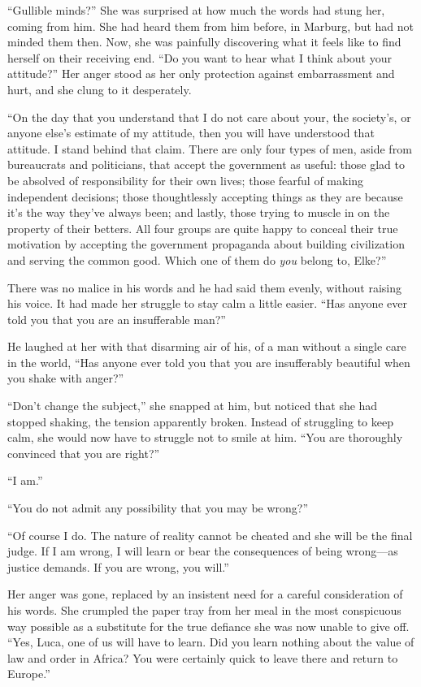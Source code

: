 ``Gullible minds?'' She was surprised at how much the words had stung her, coming from him. She had heard them from him before, in Marburg, but had not minded them then. Now, she was painfully discovering what it feels like to find herself on their receiving end. ``Do you want to hear what I think about your attitude?'' Her anger stood as her only protection against embarrassment and hurt, and she clung to it desperately.

``On the day that you understand that I do not care about your, the society's, or anyone else's estimate of my attitude, then you will have understood that attitude. I stand behind that claim. There are only four types of men, aside from bureaucrats and politicians, that accept the government as useful: those glad to be absolved of responsibility for their own lives; those fearful of making independent decisions; those thoughtlessly accepting things as they are because it's the way they've always been; and lastly, those trying to muscle in on the property of their betters. All four groups are quite happy to conceal their true motivation by accepting the government propaganda about building civilization and serving the common good. Which one of them do \emph{you} belong to, Elke?''

There was no malice in his words and he had said them evenly, without raising his voice. It had made her struggle to stay calm a little easier. ``Has anyone ever told you that you are an insufferable man?''

He laughed at her with that disarming air of his, of a man without a single care in the world, ``Has anyone ever told you that you are insufferably beautiful when you shake with anger?''

``Don't change the subject,'' she snapped at him, but noticed that she had stopped shaking, the tension apparently broken. Instead of struggling to keep calm, she would now have to struggle not to smile at him. ``You are thoroughly convinced that you are right?''

``I am.''

``You do not admit any possibility that you may be wrong?''

``Of course I do. The nature of reality cannot be cheated and she will be the final judge. If I am wrong, I will learn or bear the consequences of being wrong---as justice demands. If you are wrong, you will.''

Her anger was gone, replaced by an insistent need for a careful consideration of his words. She crumpled the paper tray from her meal in the most conspicuous way possible as a substitute for the true defiance she was now unable to give off. ``Yes, Luca, one of us will have to learn. Did you learn nothing about the value of law and order in Africa? You were certainly quick to leave there and return to Europe.''

